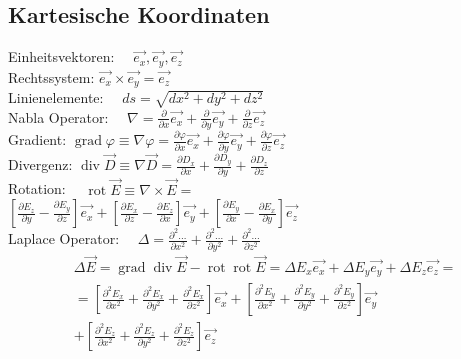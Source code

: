 \subsection{Kartesische Koordinaten}
Einheitsvektoren:   $\quad \vec{e_{x}}, \vec{e_{y}}, \vec{e_{z}}$\\ 
Rechtssystem:       $\vec{e_{x}} \times \vec{e_{y}}=\vec{e_{z}}$\\
Linienelemente:     $\quad d s=\sqrt{d x^{2}+d y^{2}+d z^{2}}$\\
Nabla Operator:     $\quad \nabla=\frac{\partial}{\partial x} \vec{e_{x}}+\frac{\partial}{\partial y} \vec{e_{y}}+\frac{\partial}{\partial z} \vec{e_{z}}$\\
Gradient:           $\operatorname{grad} \varphi \equiv \nabla \varphi=\frac{\partial \varphi}{\partial x} \vec{e_{x}}+\frac{\partial \varphi}{\partial y} \vec{e_{y}}+\frac{\partial \varphi}{\partial z} \vec{e_{z}}$\\
Divergenz:          $\operatorname{div} \vec{D} \equiv \nabla \vec{D}=\frac{\partial D_{x}}{\partial x}+\frac{\partial D_{y}}{\partial y}+\frac{\partial D_{z}}{\partial z}$\\
Rotation:           $\quad \operatorname{rot} \vec{E} \equiv \nabla \times \vec{E} =$\\
                        $\left[\frac{\partial E_{z}}{\partial y}-\frac{\partial E_{y}}{\partial z}\right] \vec{e_{x}}+\left[\frac{\partial E_{x}}{\partial z}-\frac{\partial E_{z}}{\partial x}\right] \vec{e_{y}}+\left[\frac{\partial E_{y}}{\partial x}-\frac{\partial E_{x}}{\partial y}\right] \vec{e_{z}}$\\
Laplace Operator:   $\quad \Delta=\frac{\partial^{2} \ldots}{\partial x^{2}}+\frac{\partial^{2} \ldots}{\partial y^{2}}+\frac{\partial^{2} \ldots}{\partial z^{2}}$\\
\begin{align*}
    &\Delta \vec{E} = \operatorname{grad} \operatorname{div} \vec{E}-\operatorname{rot} \operatorname{rot} \vec{E} =\Delta E_{x} \vec{e_{x}}+\Delta E_{y} \vec{e_{y}}+\Delta E_{z} \vec{e_{z}}=\\
                   &= \left[\frac{\partial^{2} E_{x}}{\partial x^{2}}+\frac{\partial^{2} E_{x}}{\partial y^{2}}+\frac{\partial^{2} E_{x}}{\partial z^{2}}\right] \vec{e_{x}}+\left[\frac{\partial^{2} E_{y}}{\partial x^{2}}+\frac{\partial^{2} E_{y}}{\partial y^{2}}+\frac{\partial^{2} E_{y}}{\partial z^{2}}\right] \vec{e_{y}}\\
                   &+ \left[\frac{\partial^{2} E_{z}}{\partial x^{2}}+\frac{\partial^{2} E_{z}}{\partial y^{2}}+\frac{\partial^{2} E_{z}}{\partial z^{2}}\right] \vec{e_{z}}
\end{align*}